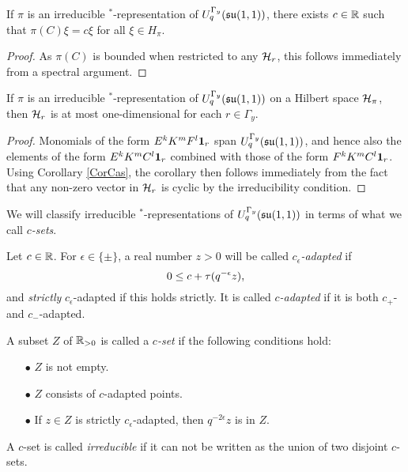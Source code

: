 


\begin{Lem}\label{CorCas} If $\pi$ is an irreducible $^*$-representation of $U_q^{\Gamma_y}(\mathfrak{su}(1,1))$, there exists $c\in \mathbb{R}$ such that $\pi(C)\xi = c\xi$ for all $\xi \in H_{\pi}$. 
\end{Lem} 
\begin{proof} As $\pi(C)$ is bounded when restricted to any $\mathcal{H}_r$, this follows immediately from a spectral argument. 
\end{proof} 

\begin{Cor}\label{CorOneDim} If $\pi$ is an irreducible $^*$-representation of $U_q^{\Gamma_y}(\mathfrak{su}(1,1))$ on a Hilbert space $\mathcal{H}_{\pi}$, then $\mathcal{H}_r$ is at most one-dimensional for each $r\in \Gamma_y$. %
\end{Cor} 
\begin{proof} 
Monomials of the form $E^kK^mF^l\mathbf{1}_r$ span $U_q^{\Gamma_y}(\mathfrak{su}(1,1))$, and hence also the elements of the form $E^kK^mC^l\mathbf{1}_r$ combined with those of the form $F^kK^mC^l\mathbf{1}_r$. Using Corollary \ref{CorCas}, the corollary then follows immediately from the fact that any non-zero vector in $\mathcal{H}_r$ is cyclic by the irreducibility condition.
\end{proof}

We will classify irreducible $^*$-representations of $U_q^{\Gamma_y}(\mathfrak{su}(1,1))$ in terms of what we call \emph{$c$-sets}.

\begin{Def}\label{DefAdapt} Let $c\in\mathbb{R}$. For $\epsilon \in \{\pm\}$, a real number $z>0$ will be called \emph{$c_{\epsilon}$-adapted} if \begin{equation}\label{EqAd+}  0 \leq c+ \operatorname{\tau}(q^{-\epsilon}z),\end{equation} and \emph{strictly} $c_{\epsilon}$-adapted if this holds strictly. It is called \emph{$c$-adapted} if it is both $c_+$- and $c_-$-adapted. 

A subset $Z$ of $\mathbb{R}_{>0}$ is called a \emph{$c$-set} if the following conditions hold: \begin{itemize} 
\item[$\bullet$] $Z$ is not empty.
\item[$\bullet$] $Z$ consists of $c$-adapted points.
\item[$\bullet$] If $z\in Z$ is strictly $c_{\epsilon}$-adapted, then $q^{-2\epsilon}z$ is in $Z$.
\end{itemize}
A $c$-set is called \emph{irreducible} if it can not be written as the union of two disjoint $c$-sets.
\end{Def}


